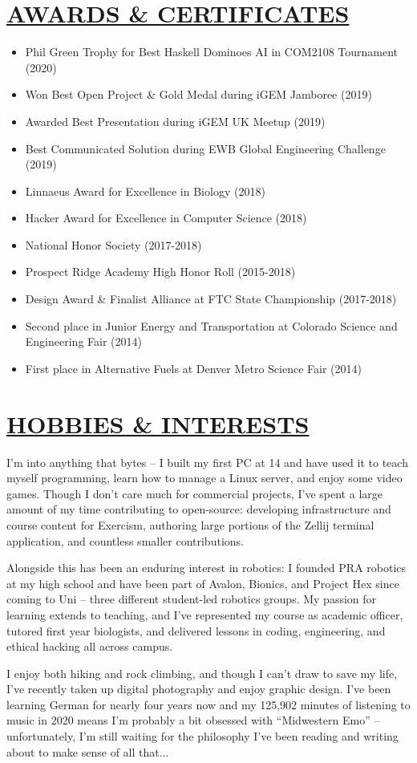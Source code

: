 \documentclass[twocolumn, a4paper, fontsize=9pt, headsepline, footsepline]{scrartcl}
\begin{document}
\section*{\ul{AWARDS \& CERTIFICATES}}
\begin{itemize}
\item Phil Green Trophy for Best Haskell Dominoes AI in COM2108 Tournament (2020)
\item Won Best Open Project \& Gold Medal during iGEM Jamboree (2019)
\item Awarded Best Presentation during iGEM UK Meetup (2019)
\item Best Communicated Solution during EWB Global Engineering Challenge (2019)
\item Linnaeus Award for Excellence in Biology (2018)
\item Hacker Award for Excellence in Computer Science (2018)
\item National Honor Society (2017-2018)
\item Prospect Ridge Academy High Honor Roll (2015-2018)
\item Design Award \& Finalist Alliance at FTC State Championship (2017-2018)
\item Second place in Junior Energy and Transportation at Colorado Science and
  Engineering Fair (2014)
\item First place in Alternative Fuels at Denver Metro Science Fair (2014)
\end{itemize}
\section*{\ul{HOBBIES \& INTERESTS}}
\noindent
I'm into anything that bytes – I built my first PC at 14 and have used it to
teach myself programming, learn how to manage a Linux server, and enjoy some
video games. Though I don't care much for commercial projects, I've spent a
large amount of my time contributing to open-source: developing infrastructure
and course content for Exercism, authoring large portions of the Zellij terminal
application, and countless smaller contributions.

Alongside this has been an enduring interest in robotics: I founded PRA robotics
at my high school and have been part of Avalon, Bionics, and Project Hex since
coming to Uni – three different student-led robotics groups. My passion for
learning extends to teaching, and I've represented my course as academic
officer, tutored first year biologists, and delivered lessons in coding,
engineering, and ethical hacking all across campus.

I enjoy both hiking and rock climbing, and though I can't draw to save my life,
I've recently taken up digital photography and enjoy graphic design. I've been
learning German for nearly four years now and my 125,902 minutes of listening to
music in 2020 means I'm probably a bit obsessed with ``Midwestern Emo'' –
unfortunately, I'm still waiting for the philosophy I've been reading and
writing about to make sense of all that...
\pagebreak
\end{document}
